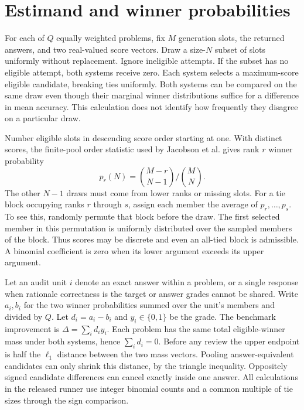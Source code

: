 \documentclass[11pt]{article}
\newcommand{\D}{\Delta}
\begin{document}
\section{Estimand and winner probabilities}
For each of $Q$ equally weighted problems, fix $M$ generation slots, the returned answers, and two real-valued score vectors. Draw a size-$N$ subset of slots uniformly without replacement. Ignore ineligible attempts. If the subset has no eligible attempt, both systems receive zero. Each system selects a maximum-score eligible candidate, breaking ties uniformly. Both systems can be compared on the same draw even though their marginal winner distributions suffice for a difference in mean accuracy. This calculation does not identify how frequently they disagree on a particular draw.

Number eligible slots in descending score order starting at one. With distinct scores, the finite-pool order statistic used by Jacobson et al. \cite{jacobson} gives rank $r$ winner probability
\[
 p_r(N)=\binom{M-r}{N-1}\big/\binom{M}{N}.
\]
The other $N-1$ draws must come from lower ranks or missing slots. For a tie block occupying ranks $r$ through $s$, assign each member the average of $p_r,\ldots,p_s$. To see this, randomly permute that block before the draw. The first selected member in this permutation is uniformly distributed over the sampled members of the block. Thus scores may be discrete and even an all-tied block is admissible. A binomial coefficient is zero when its lower argument exceeds its upper argument.

Let an audit unit $i$ denote an exact answer within a problem, or a single response when rationale correctness is the target or answer grades cannot be shared. Write $a_i,b_i$ for the two winner probabilities summed over the unit's members and divided by $Q$. Let $d_i=a_i-b_i$ and $y_i\in\{0,1\}$ be the grade. The benchmark improvement is $\D=\sum_i d_i y_i$. Each problem has the same total eligible-winner mass under both systems, hence $\sum_i d_i=0$. Before any review the upper endpoint is half the $\ell_1$ distance between the two mass vectors. Pooling answer-equivalent candidates can only shrink this distance, by the triangle inequality. Oppositely signed candidate differences can cancel exactly inside one answer. All calculations in the released runner use integer binomial counts and a common multiple of tie sizes through the sign comparison.
\end{document}
